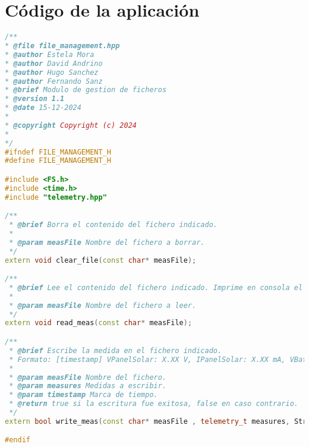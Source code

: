 \section{Código de la aplicación}

\begin{lstlisting}[language=c++,caption={Fichero \texttt{file\_management.hpp}},captionpos=b]
/**
* @file file_management.hpp
* @author Estela Mora
* @author David Andrino
* @author Hugo Sanchez
* @author Fernando Sanz
* @brief Modulo de gestion de ficheros
* @version 1.1
* @date 15-12-2024
* 
* @copyright Copyright (c) 2024
* 
*/
#ifndef FILE_MANAGEMENT_H
#define FILE_MANAGEMENT_H

#include <FS.h>
#include <time.h>
#include "telemetry.hpp"

/**
 * @brief Borra el contenido del fichero indicado.
 * 
 * @param measFile Nombre del fichero a borrar.
 */
extern void clear_file(const char* measFile);

/**
 * @brief Lee el contenido del fichero indicado. Imprime en consola el contenido.
 * 
 * @param measFile Nombre del fichero a leer.
 */
extern void read_meas(const char* measFile);

/**
 * @brief Escribe la medida en el fichero indicado.
 * Formato: [timestamp] VPanelSolar: X.XX V, IPanelSolar: X.XX mA, VBatBackup: X.XX V, IBatBackup: X.XX mA, VBat1: X.XX V, IBat1: X.XX mA, VBat2: X.XX V, IBat2: X.XX mA
 * 
 * @param measFile Nombre del fichero.
 * @param measures Medidas a escribir.
 * @param timestamp Marca de tiempo.
 * @return true si la escritura fue exitosa, false en caso contrario.
 */
extern bool write_meas(const char* measFile , telemetry_t measures, String timestamp);

#endif
\end{lstlisting}

